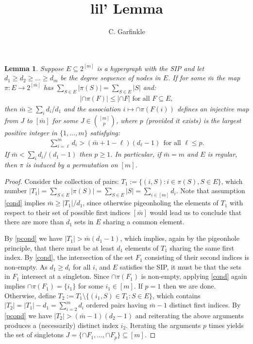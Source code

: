 \documentclass[journal, twocolumn]{IEEEtran}
\newtheorem{lemma}{Lemma}
\begin{document}
\title{lil' Lemma}

\author{C. Garfinkle}

\maketitle

\begin{lemma}
Suppose $E \subseteq 2^{[m]}$ is a hypergraph with the SIP and let $d_1 \geq d_2 \geq \ldots \geq d_m$ be the degree sequence of nodes in $E$. If for some $\bar m$ the map $\pi: E \to 2^{[\bar m]}$ has $\sum_{S \in E} |\pi(S)| = \sum_{S \in E} |S|$ and:
\begin{align}\label{cond}
|\cap \pi(F)| \leq |\cap F | \text{ for all } F \subseteq E,
\end{align}
then $\bar m \geq\sum_i d_i / d_1$ and the association $i \mapsto \cap \pi(F(i))$ defines an injective map from $J$ to $[\bar m]$ for some $J \in {[m] \choose p}$, where $p$ (provided it exists) is the largest positive integer in $\{1, \ldots, m\}$ satisfying:
\begin{align}\label{pcond}
\sum_{i=\ell}^{m} d_{i} > (\bar m + 1 - \ell) (d_\ell - 1) \ \ \text{for all } \ell \leq p.
\end{align}
If $\bar m < \sum_i d_i / (d_1 - 1)$ then $p \geq 1$. 
In particular, if $\bar m = m$ and $E$ is regular, then $\pi$ is induced by a permutation on $[m]$. 
\end{lemma}

\begin{proof}
Consider the collection of pairs: $T_1 := \{(i, S): i \in \pi(S), S \in E\}$, which number $|T_1| = \sum_{S \in E} |\pi(S)| = \sum_{S \in E} |S| = \sum_{i \in [m]} d_i$. Note that assumption \eqref{cond} implies $\bar m \geq |T_1| / d_1$, since otherwise pigeonholing the elements of $T_1$ with respect to their set of possible first indices $[\bar m]$ would lead us to conclude that there are more than $d_1$ sets in $E$ sharing a common element. %

By \eqref{pcond} we have $|T_1| >  \bar m (d_1 - 1)$, which implies, again by the pigeonhole principle, that there must be at least $d_1$ elements of $T_1$ sharing the same first index. By \eqref{cond}, the intersection of the set $F_1$ consisting of their second indices is non-empty. As $d_1 \geq d_i$ for all $i$, and $E$ satisfies the SIP, it must be that the sets in $F_1$ intersect at a singleton. Since $\cap \pi(F_1)$ is non-empty, applying \eqref{cond} again implies $\cap \pi(F_1) = \{i_1\}$ for some $i_1 \in [m]$. If $p=1$ then we are done. Otherwise, define $T_2 := T_1 \setminus \{(i_1,S) \in T_1: S \in E\}$, which contains $|T_2| = |T_1| - d_1 = \sum_{i=2}^m d_i$ ordered pairs having $\bar m - 1$ distinct first indices. By \eqref{pcond} we have $|T_2| > (\bar m - 1)(d_2 - 1)$ and reiterating the above arguments produces a (necessarily) distinct index $i_2$. Iterating the arguments $p$ times yields the set of singletons \mbox{$J = \{\cap F_1, \ldots, \cap F_p\} \subseteq [m]$}.
\end{proof}
\end{document}
